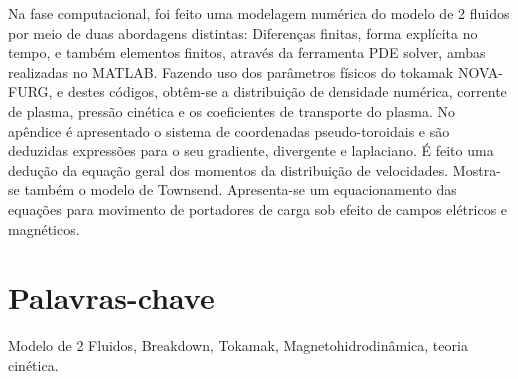 \documentclass[12pt,oneside,a4paper]{abntex2}
\begin{document}
Na fase computacional, foi feito uma modelagem numérica do modelo de 2 fluidos por meio de duas abordagens distintas: Diferenças finitas, forma explícita no tempo, e também elementos finitos, através da ferramenta PDE solver, ambas realizadas no MATLAB. 
Fazendo uso dos parâmetros físicos do tokamak NOVA-FURG, e destes códigos, obtêm-se a distribuição de densidade numérica, corrente de plasma, pressão cinética e os coeficientes de transporte do plasma. 
No apêndice é apresentado o sistema de coordenadas pseudo-toroidais e são deduzidas expressões para o seu gradiente, divergente e laplaciano. É feito uma dedução da equação geral dos momentos da distribuição de velocidades. Mostra-se também o modelo de Townsend. Apresenta-se um equacionamento das equações para movimento de portadores de carga sob efeito de campos elétricos e magnéticos.


\section*{Palavras-chave}
Modelo de 2 Fluidos, Breakdown, Tokamak, Magnetohidrodinâmica, teoria cinética.
\end{document}
